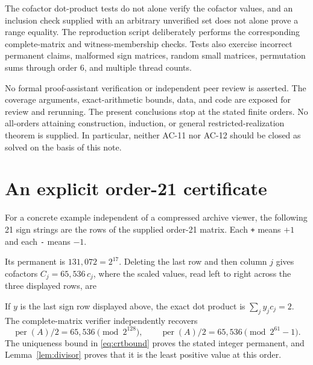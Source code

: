 \documentclass[11pt,a4paper]{article}
\theoremstyle{remark}\newtheorem{remark}[theorem]{Remark}
\DeclareMathOperator{\per}{per}
\begin{document}
The cofactor dot-product tests do not alone verify the cofactor values, and an inclusion check supplied with an arbitrary unverified set does not alone prove a range equality. The reproduction script deliberately performs the corresponding complete-matrix and witness-membership checks. Tests also exercise incorrect permanent claims, malformed sign matrices, random small matrices, permutation sums through order 6, and multiple thread counts.

No formal proof-assistant verification or independent peer review is asserted. The coverage arguments, exact-arithmetic bounds, data, and code are exposed for review and rerunning. The present conclusions stop at the stated finite orders. No all-orders attaining construction, induction, or general restricted-realization theorem is supplied. In particular, neither AC-11 nor AC-12 should be closed as solved on the basis of this note.

\clearpage
\appendix
\section{An explicit order-21 certificate}
For a concrete example independent of a compressed archive viewer, the following 21 sign strings are the rows of the supplied order-21 matrix. Each \texttt{+} means $+1$ and each \texttt{-} means $-1$.
\begin{center}\small

\end{center}
Its permanent is $131,072=2^{17}$. Deleting the last row and then column $j$ gives cofactors $C_j=65,536\,c_j$, where the scaled values, read left to right across the three displayed rows, are

If $y$ is the last sign row displayed above, the exact dot product is $\sum_jy_jc_j=2$. The complete-matrix verifier independently recovers
\[
 \per(A)/2=65,536\pmod{2^{128}},\qquad
 \per(A)/2=65,536\pmod{2^{61}-1}.
\]
The uniqueness bound in \eqref{eq:crtbound} proves the stated integer permanent, and Lemma~\ref{lem:divisor} proves that it is the least positive value at this order.
\end{document}
